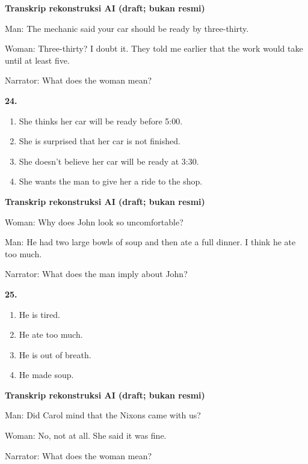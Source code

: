 \documentclass[12pt]{article}
\begin{document}
\begin{exampleblock}
\textbf{Transkrip rekonstruksi AI (draft; bukan resmi)}\par
Man: The mechanic said your car should be ready by three-thirty.\par
Woman: Three-thirty? I doubt it. They told me earlier that the work would take until at least five.\par
Narrator: What does the woman mean?\par
\end{exampleblock}
\noindent\textbf{24.}
\begin{enumerate}[label=(\Alph*),leftmargin=*,itemsep=0.2em]
\item She thinks her car will be ready before 5:00.
\item She is surprised that her car is not finished.
\item She doesn't believe her car will be ready at 3:30.
\item She wants the man to give her a ride to the shop.
\end{enumerate}
\par
\vspace{0.25\baselineskip}
\begin{exampleblock}
\textbf{Transkrip rekonstruksi AI (draft; bukan resmi)}\par
Woman: Why does John look so uncomfortable?\par
Man: He had two large bowls of soup and then ate a full dinner. I think he ate too much.\par
Narrator: What does the man imply about John?\par
\end{exampleblock}
\noindent\textbf{25.}
\begin{enumerate}[label=(\Alph*),leftmargin=*,itemsep=0.2em]
\item He is tired.
\item He ate too much.
\item He is out of breath.
\item He made soup.
\end{enumerate}
\par
\vspace{0.25\baselineskip}
\begin{exampleblock}
\textbf{Transkrip rekonstruksi AI (draft; bukan resmi)}\par
Man: Did Carol mind that the Nixons came with us?\par
Woman: No, not at all. She said it was fine.\par
Narrator: What does the woman mean?\par
\end{exampleblock}
\end{document}
